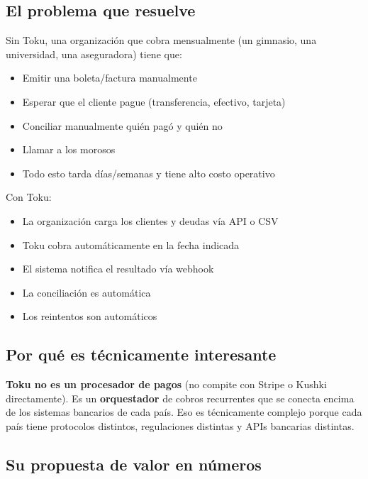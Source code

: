 \documentclass[11pt,a4paper]{article}
\begin{document}
\subsection{El problema que resuelve}

Sin Toku, una organización que cobra mensualmente (un gimnasio, una universidad, una aseguradora)
tiene que:

\begin{itemize}
  \item Emitir una boleta/factura manualmente
  \item Esperar que el cliente pague (transferencia, efectivo, tarjeta)
  \item Conciliar manualmente quién pagó y quién no
  \item Llamar a los morosos
  \item Todo esto tarda días/semanas y tiene alto costo operativo
\end{itemize}

Con Toku:
\begin{itemize}
  \item La organización carga los clientes y deudas vía API o CSV
  \item Toku cobra automáticamente en la fecha indicada
  \item El sistema notifica el resultado vía webhook
  \item La conciliación es automática
  \item Los reintentos son automáticos
\end{itemize}

\subsection{Por qué es técnicamente interesante}

\begin{tcolorbox}[colback=tokucyan!5,colframe=tokucyan]
\textbf{Toku no es un procesador de pagos} (no compite con Stripe o Kushki directamente).
Es un \textbf{orquestador} de cobros recurrentes que se conecta encima de los sistemas
bancarios de cada país. Eso es técnicamente complejo porque cada país tiene protocolos
distintos, regulaciones distintas y APIs bancarias distintas.
\end{tcolorbox}

\subsection{Su propuesta de valor en números}
\end{document}
